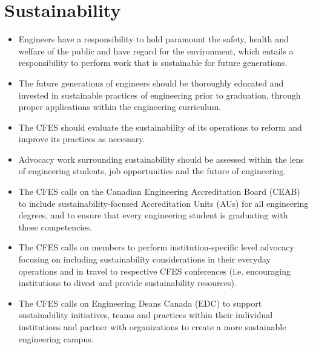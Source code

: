 \section{Sustainability}\label{sustainability}



\begin{itemize}
 \item Engineers have a responsibility to hold paramount the safety, health and welfare of the public and have regard for the environment, which entails a responsibility to perform work that is sustainable for future generations.
 \item The future generations of engineers should be thoroughly educated and invested in sustainable practices of engineering prior to graduation, through proper applications within the engineering curriculum.
 \item The CFES should evaluate the sustainability of its operations to reform and improve its practices as necessary.
 \item Advocacy work surrounding sustainability should be assessed within the lens of engineering students, job opportunities and the future of engineering.
\end{itemize}

\begin{itemize}
 \item The CFES calls on the Canadian Engineering Accreditation Board (CEAB) to include sustainability-focused Accreditation Units (AUs) for all engineering degrees, and to ensure that every engineering student is graduating with those competencies.
 \item The CFES calls on members to perform institution-specific level advocacy focusing on including sustainability considerations in their everyday operations and in travel to respective CFES conferences (i.e. encouraging institutions to divest and provide sustainability resources).
 \item The CFES calls on Engineering Deans Canada (EDC) to support sustainability initiatives, teams and practices within their individual institutions and partner with organizations to create a more sustainable engineering campus.
\end{itemize}

